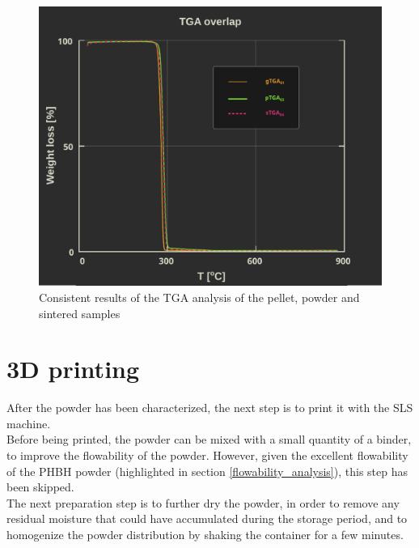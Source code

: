 \documentclass{article}
\begin{document}
            \begin{figure}[h!]
                \centering
                \includegraphics[width=\textwidth]{Pictures/Thermal_analysis_plots/TGA_catalogued/Fixed/TGA_overlapped.pdf}
                \caption{Consistent results of the TGA analysis of the pellet, powder and sintered samples}
                \label{fig:TGA_overlapped}
            \end{figure}




    \clearpage
    \section{3D printing\label{SLS_printing_experimental}}

    After the powder has been characterized, the next step is to print it with the SLS machine. \\

    Before being printed, the powder can be mixed with a small quantity of a binder, to improve the flowability of the powder. 
    However, given the excellent flowability of the PHBH powder (highlighted in section \ref{flowability_analysis}), this step has been skipped. \\

    The next preparation step is to further dry the powder, in order to remove any residual moisture
    that could have accumulated during the storage period, and to homogenize the powder distribution 
    by shaking the container for a few minutes. \\
\end{document}
